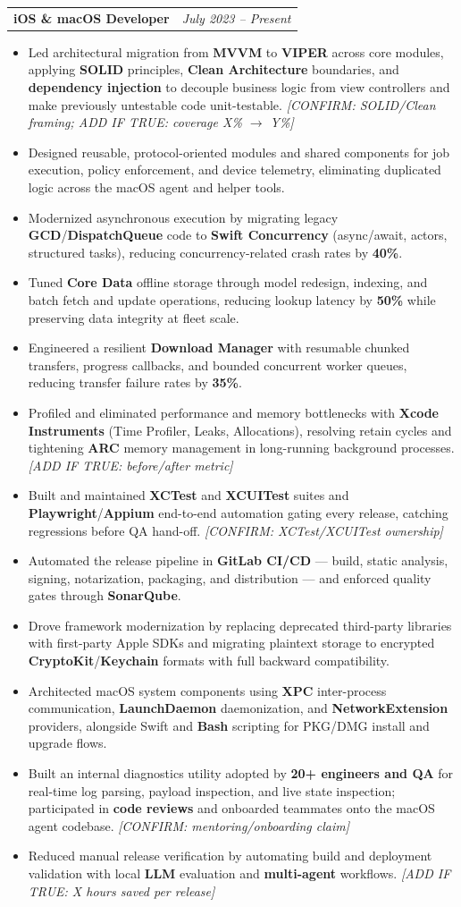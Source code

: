\documentclass[letterpaper,11pt]{article}
\makeatletter
\newcommand{\resumeItem}[1]{\item\small{{#1 \vspace{-2pt}}}}
\newcommand{\resumeRole}[2]{
    \item
    \begin{tabular*}{0.97\textwidth}{l@{\extracolsep{\fill}}r}
      \textbf{\small#1} & \textit{\small #2} \\
    \end{tabular*}\vspace{-7pt}
}
\newcommand{\resumeItemListStart}{\begin{itemize}}
\newcommand{\resumeItemListEnd}{\end{itemize}\vspace{-5pt}}
\makeatother
\begin{document}
        \resumeRole{iOS \& macOS Developer}{July 2023 -- Present}
            \resumeItemListStart
                \resumeItem{Led architectural migration from \textbf{MVVM} to \textbf{VIPER} across core modules, applying \textbf{SOLID} principles, \textbf{Clean Architecture} boundaries, and \textbf{dependency injection} to decouple business logic from view controllers and make previously untestable code unit-testable. \textit{[CONFIRM: SOLID/Clean framing; ADD IF TRUE: coverage X\% $\rightarrow$ Y\%]}}
                \resumeItem{Designed reusable, protocol-oriented modules and shared components for job execution, policy enforcement, and device telemetry, eliminating duplicated logic across the macOS agent and helper tools.}
                \resumeItem{Modernized asynchronous execution by migrating legacy \textbf{GCD}/\textbf{DispatchQueue} code to \textbf{Swift Concurrency} (async/await, actors, structured tasks), reducing concurrency-related crash rates by \textbf{40\%}.}
                \resumeItem{Tuned \textbf{Core Data} offline storage through model redesign, indexing, and batch fetch and update operations, reducing lookup latency by \textbf{50\%} while preserving data integrity at fleet scale.}
                \resumeItem{Engineered a resilient \textbf{Download Manager} with resumable chunked transfers, progress callbacks, and bounded concurrent worker queues, reducing transfer failure rates by \textbf{35\%}.}
                \resumeItem{Profiled and eliminated performance and memory bottlenecks with \textbf{Xcode Instruments} (Time Profiler, Leaks, Allocations), resolving retain cycles and tightening \textbf{ARC} memory management in long-running background processes. \textit{[ADD IF TRUE: before/after metric]}}
                \resumeItem{Built and maintained \textbf{XCTest} and \textbf{XCUITest} suites and \textbf{Playwright}/\textbf{Appium} end-to-end automation gating every release, catching regressions before QA hand-off. \textit{[CONFIRM: XCTest/XCUITest ownership]}}
                \resumeItem{Automated the release pipeline in \textbf{GitLab CI/CD} — build, static analysis, signing, notarization, packaging, and distribution — and enforced quality gates through \textbf{SonarQube}.}
                \resumeItem{Drove framework modernization by replacing deprecated third-party libraries with first-party Apple SDKs and migrating plaintext storage to encrypted \textbf{CryptoKit}/\textbf{Keychain} formats with full backward compatibility.}
                \resumeItem{Architected macOS system components using \textbf{XPC} inter-process communication, \textbf{LaunchDaemon} daemonization, and \textbf{NetworkExtension} providers, alongside Swift and \textbf{Bash} scripting for PKG/DMG install and upgrade flows.}
                \resumeItem{Built an internal diagnostics utility adopted by \textbf{20+ engineers and QA} for real-time log parsing, payload inspection, and live state inspection; participated in \textbf{code reviews} and onboarded teammates onto the macOS agent codebase. \textit{[CONFIRM: mentoring/onboarding claim]}}
                \resumeItem{Reduced manual release verification by automating build and deployment validation with local \textbf{LLM} evaluation and \textbf{multi-agent} workflows. \textit{[ADD IF TRUE: X hours saved per release]}}
            \resumeItemListEnd
\end{document}
